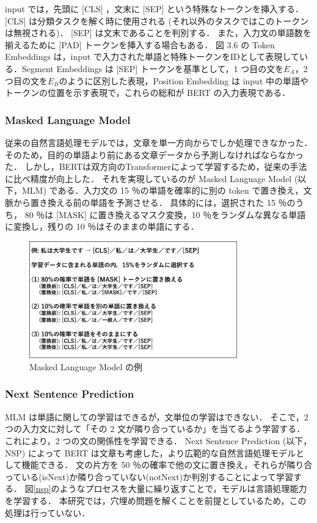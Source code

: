 input では，先頭に [CLS] ，文末に [SEP] という特殊なトークンを挿入する．
[CLS] は分類タスクを解く時に使用される (それ以外のタスクではこのトークンは無視される)．
[SEP] は文末であることを判別する．
また，入力文の単語数を揃えるために [PAD] トークンを挿入する場合もある．
図 3.6 の Token Embeddings は，input で入力された単語と特殊トークンをIDとして表現している．Segment Embeddings は [SEP] トークンを基準として，1 つ目の文を${E_A}$，2 つ目の文を${E_B}$のように区別した表現，Position Embedding は input 中の単語やトークンの位置を示す表現で，これらの総和が  BERT の入力表現である．

\subsubsection{Masked Language Model}
従来の自然言語処理モデルでは，文章を単一方向からでしか処理できなかった．
そのため，目的の単語より前にある文章データから予測しなければならなかった．
しかし，BERTは双方向のTransformerによって学習するため，従来の手法に比べ精度が向上した．
それを実現しているのが Masked Language Model (以下，MLM) である．入力文の 15 ％の単語を確率的に別の token で置き換え，文脈から置き換える前の単語を予測させる．
具体的には，選択された 15 ％のうち， 80 ％は [MASK] に置き換えるマスク変換，10 ％をランダムな異なる単語に変換し，残りの 10 ％はそのままの単語にする．

\begin{figure}[H]
	\centering
	\includegraphics[width=90mm]{image/BERT-mlm.png}
	\caption{Masked Language Model の例}
	\label{mlm}
\end{figure}

\subsubsection{Next Sentence Prediction}
MLM は単語に関しての学習はできるが，文単位の学習はできない．
そこで，2 つの入力文に対して「その 2 文が隣り合っているか」を当てるよう学習する．
これにより，2 つの文の関係性を学習できる．
Next Sentence Prediction (以下，NSP) によって BERT は文章も考慮した，より広範的な自然言語処理モデルとして機能できる．
文の片方を 50 ％の確率で他の文に置き換え，それらが隣り合っている(isNext)か隣り合っていない(notNext)か判別することによって学習する．
図\ref{nsp}のようなプロセスを大量に繰り返すことで，モデルは言語処理能力を学習する．
本研究では，穴埋め問題を解くことを前提としているため，この処理は行っていない．


